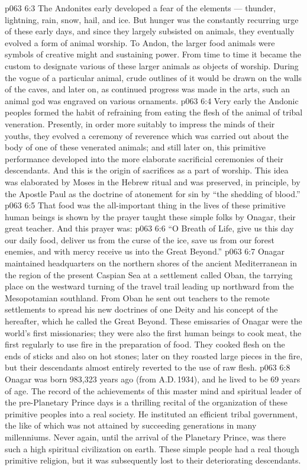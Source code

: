 \vs p063 6:3 The Andonites early developed a fear of the elements --- thunder, lightning, rain, snow, hail, and ice. But hunger was the constantly recurring urge of these early days, and since they largely subsisted on animals, they eventually evolved a form of animal worship. To Andon, the larger food animals were symbols of creative might and sustaining power. From time to time it became the custom to designate various of these larger animals as objects of worship. During the vogue of a particular animal, crude outlines of it would be drawn on the walls of the caves, and later on, as continued progress was made in the arts, such an animal god was engraved on various ornaments.
\vs p063 6:4 Very early the Andonic peoples formed the habit of refraining from eating the flesh of the animal of tribal veneration. Presently, in order more suitably to impress the minds of their youths, they evolved a ceremony of reverence which was carried out about the body of one of these venerated animals; and still later on, this primitive performance developed into the more elaborate sacrificial ceremonies of their descendants. And this is the origin of sacrifices as a part of worship. This idea was elaborated by Moses in the Hebrew ritual and was preserved, in principle, by the Apostle Paul as the doctrine of atonement for sin by “the shedding of blood.”
\vs p063 6:5 That food was the all\hyp{}important thing in the lives of these primitive human beings is shown by the prayer taught these simple folks by Onagar, their great teacher. And this prayer was:
\vs p063 6:6 “O Breath of Life, give us this day our daily food, deliver us from the curse of the ice, save us from our forest enemies, and with mercy receive us into the Great Beyond.”
\vs p063 6:7 \pc Onagar maintained headquarters on the northern shores of the ancient Mediterranean in the region of the present Caspian Sea at a settlement called Oban, the tarrying place on the westward turning of the travel trail leading up northward from the Mesopotamian southland. From Oban he sent out teachers to the remote settlements to spread his new doctrines of one Deity and his concept of the hereafter, which he called the Great Beyond. These emissaries of Onagar were the world’s first missionaries; they were also the first human beings to cook meat, the first regularly to use fire in the preparation of food. They cooked flesh on the ends of sticks and also on hot stones; later on they roasted large pieces in the fire, but their descendants almost entirely reverted to the use of raw flesh.
\vs p063 6:8 Onagar was born 983,323 years ago (from A.D.\,1934), and he lived to be 69 years of age. The record of the achievements of this master mind and spiritual leader of the pre\hyp{}Planetary Prince days is a thrilling recital of the organization of these primitive peoples into a real society. He instituted an efficient tribal government, the like of which was not attained by succeeding generations in many millenniums. Never again, until the arrival of the Planetary Prince, was there such a high spiritual civilization on earth. These simple people had a real though primitive religion, but it was subsequently lost to their deteriorating descendants.
